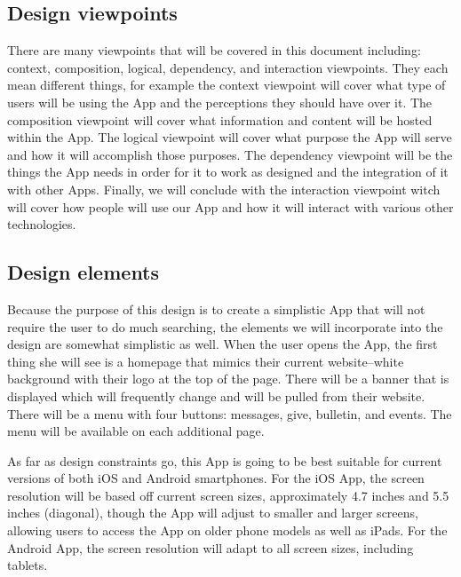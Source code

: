 \documentclass[letterpaper,10pt,draftclsnofoot,onecolumn,titlepage]{IEEEtran}
\begin{document}
		\subsection{Design viewpoints}
		There are many viewpoints that will be covered in this document including: context, composition, logical, dependency, and interaction viewpoints.
		They each mean different things, for example the context viewpoint will cover what type of users will be using the \gls{App} and the perceptions they should have over it.
		The composition viewpoint will cover what information and content will be hosted within the \gls{App}.
		The logical viewpoint will cover what purpose the \gls{App} will serve and how it will accomplish those purposes.
		The dependency viewpoint will be the things the \gls{App} needs in order for it to work as designed and the integration of it with other \glspl{App}.
		Finally, we will conclude with the interaction viewpoint witch will cover how people will use our \gls{App} and how it will interact with various other technologies.

		\subsection{Design elements}
			Because the purpose of this design is to create a simplistic \gls{App} that will not require the user to do much searching, the elements we will incorporate into the design are somewhat simplistic as well.
			When the user opens the \gls{App}, the first thing she will see is a homepage that mimics their current website--white background with their logo at the top of the page.
			There will be a banner that is displayed which will frequently change and will be pulled from their website.
			There will be a menu with four buttons: messages, give, bulletin, and events.
			The menu will be available on each additional page.

			As far as design constraints go, this \gls{App} is going to be best suitable for current versions of both \gls{iOS} and \gls{Android} smartphones.
			For the \gls{iOS} \gls{App}, the screen resolution will be based off current screen sizes, approximately 4.7 inches and 5.5 inches (diagonal), though the \gls{App} will adjust to smaller and larger screens, allowing users to access the \gls{App} on older phone models as well as iPads.
			For the \gls{Android} \gls{App}, the screen resolution will adapt to all screen sizes, including tablets.
\end{document}
